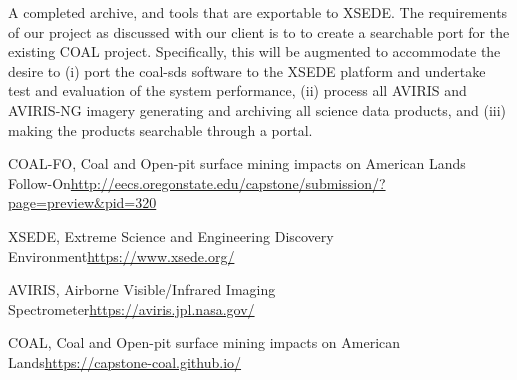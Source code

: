 \documentclass[a4paper,12pt]{article}
\begin{document}
\noindent A completed archive, and tools that are exportable to XSEDE. The requirements of our project as discussed with our client is to to create a searchable port for the existing COAL project. Specifically, this will be augmented to accommodate the desire to (i) port the coal-sds software to the XSEDE platform and undertake test and evaluation of the system performance, (ii) process all AVIRIS and AVIRIS-NG imagery generating and archiving all science data products, and (iii) making the products searchable through a portal.\newline

\newline

\noindent [1] COAL-FO, Coal and Open-pit surface mining impacts on American Lands Follow-On\newline \url{http://eecs.oregonstate.edu/capstone/submission/?page=preview\&pid=320} \newline

\noindent [2] XSEDE, Extreme Science and Engineering Discovery Environment\newline \url{https://www.xsede.org/} \newline

\noindent [3] AVIRIS, Airborne Visible/Infrared Imaging Spectrometer\newline \url{https://aviris.jpl.nasa.gov/} \newline

\noindent [4] COAL, Coal and Open-pit surface mining impacts on American Lands\newline \url{https://capstone-coal.github.io/}
\end{document}
